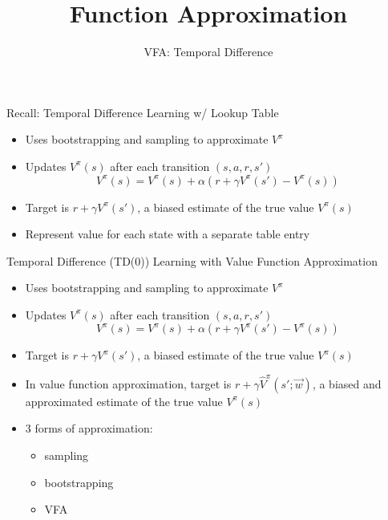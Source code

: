 


\title[RL: Function Approximation]{Function Approximation}
\subtitle{VFA: Temporal Difference}



	
	\maketitle

\begin{frame}[c]{Recall: Temporal Difference Learning w/ Lookup Table}
	
	\begin{itemize}
		\item Uses bootstrapping and sampling to approximate $V^\pi$
		\item Updates $V^\pi(s)$ after each transition $(s,a,r,s')$
		$$V^\pi(s) = V^\pi (s) + \alpha(r + \gamma V^\pi (s') - V^\pi(s)) $$
		\item Target is $r + \gamma V^\pi(s')$, a biased estimate of the true value $V^\pi(s)$
		\item Represent value for each state with a separate \alert{table entry}
	\end{itemize}

\end{frame}
\begin{frame}[c]{Temporal Difference (TD(0)) Learning with Value
		Function Approximation}
	
	\begin{itemize}
		\item Uses bootstrapping and sampling to approximate $V^\pi$
		\item Updates $V^\pi(s)$ after each transition $(s,a,r,s')$
		$$V^\pi(s) = V^\pi (s) + \alpha(r + \gamma V^\pi (s') - V^\pi(s)) $$
		\item Target is $r + \gamma V^\pi(s')$, a biased estimate of the true value $V^\pi(s)$
		\item In value \alert{function approximation}, target is $r + \gamma \hat{V}^\pi (s'; \vec{w})$, a biased and approximated estimate of the true value $V^\pi(s)$
		\item 3 forms of approximation: 
		\begin{itemize}
			\item sampling
			\item bootstrapping
			\item VFA
		\end{itemize}
	\end{itemize}
	
\end{frame}
